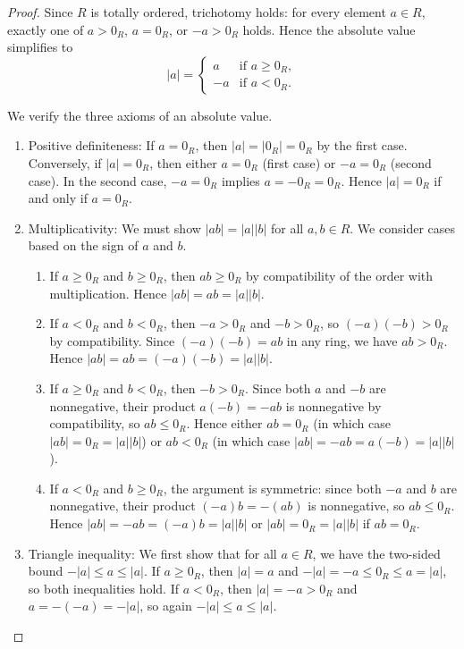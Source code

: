 \begin{proof}
    Since $R$ is totally ordered, trichotomy holds: for every element $a \in R$, exactly one of $a > 0_R$, $a = 0_R$, or $-a > 0_R$ holds. Hence the absolute value simplifies to
    $$|a| = \begin{cases} a &\text{if } a \geq 0_R, \\ -a &\text{if } a < 0_R.\end{cases}$$

    We verify the three axioms of an absolute value.

    \begin{enumerate}
        \item Positive definiteness: If $a = 0_R$, then $|a| = |0_R| = 0_R$ by the first case. Conversely, if $|a| = 0_R$, then either $a = 0_R$ (first case) or $-a = 0_R$ (second case). In the second case, $-a = 0_R$ implies $a = -0_R = 0_R$. Hence $|a| = 0_R$ if and only if $a = 0_R$.

        \item Multiplicativity: We must show $|ab| = |a||b|$ for all $a,b \in R$. We consider cases based on the sign of $a$ and $b$.
        \begin{enumerate}
            \item If $a \geq 0_R$ and $b \geq 0_R$, then $ab \geq 0_R$ by compatibility of the order with multiplication. Hence $|ab| = ab = |a||b|$.
            \item If $a < 0_R$ and $b < 0_R$, then $-a > 0_R$ and $-b > 0_R$, so $(-a)(-b) > 0_R$ by compatibility. Since $(-a)(-b) = ab$ in any ring, we have $ab > 0_R$. Hence $|ab| = ab = (-a)(-b) = |a||b|$.
            \item If $a \geq 0_R$ and $b < 0_R$, then $-b > 0_R$. Since both $a$ and $-b$ are nonnegative, their product $a(-b) = -ab$ is nonnegative by compatibility, so $ab \leq 0_R$. Hence either $ab = 0_R$ (in which case $|ab| = 0_R = |a||b|$) or $ab < 0_R$ (in which case $|ab| = -ab = a(-b) = |a||b|$).
            \item If $a < 0_R$ and $b \geq 0_R$, the argument is symmetric: since both $-a$ and $b$ are nonnegative, their product $(-a)b = -(ab)$ is nonnegative, so $ab \leq 0_R$. Hence $|ab| = -ab = (-a)b = |a||b|$ or $|ab| = 0_R = |a||b|$ if $ab = 0_R$.
        \end{enumerate}

        \item Triangle inequality: We first show that for all $a \in R$, we have the two-sided bound $-|a| \leq a \leq |a|$. If $a \geq 0_R$, then $|a| = a$ and $-|a| = -a \leq 0_R \leq a = |a|$, so both inequalities hold. If $a < 0_R$, then $|a| = -a > 0_R$ and $a = -(-a) = -|a|$, so again $-|a| \leq a \leq |a|$.


\end{enumerate}
\end{proof}
